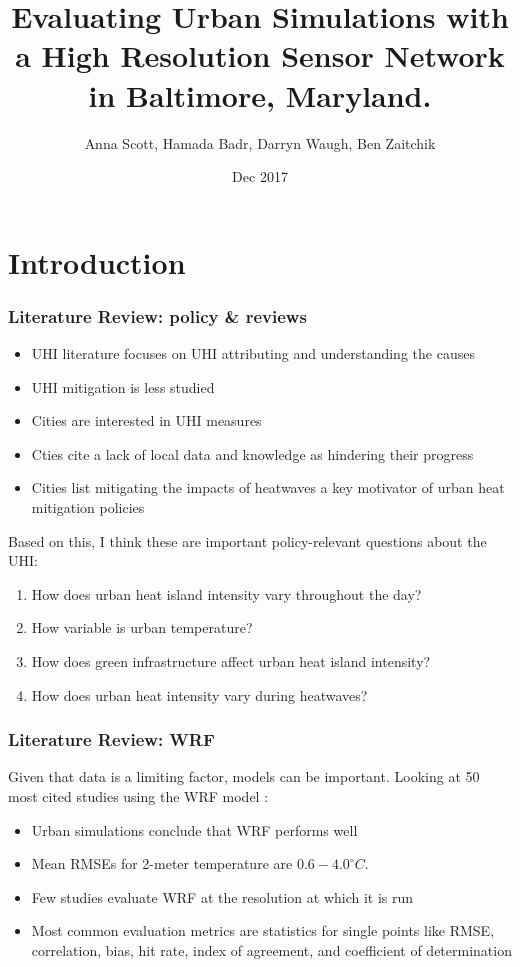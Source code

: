 \documentclass[aspectratio=169, 10pt]{beamer}
\title{Evaluating Urban Simulations with a High Resolution Sensor Network in Baltimore, Maryland.}
\subtitle{}
\date{Dec 2017}
\author{Anna Scott, Hamada Badr, Darryn Waugh, Ben Zaitchik}
\institute{annascott@jhu.edu }
\begin{document}
\maketitle



\section{Introduction}

\begin{frame}
\frametitle{Literature Review: policy \& reviews}
\begin{itemize}
\item UHI literature focuses on UHI attributing and understanding the causes 
\item UHI mitigation is less studied 
\item Cities are interested in UHI measures
\item Cties cite a lack of local data and knowledge as hindering their progress %
\item Cities list mitigating the impacts of heatwaves a key motivator of urban heat mitigation policies %
\end{itemize}
\end{frame}

\begin{frame}
Based on this, I think these are important policy-relevant questions about the UHI:  
\begin{enumerate}
\item How does urban heat island intensity vary throughout the day? 
\item How variable is urban temperature? 
\item How does green infrastructure affect urban heat island intensity? 
\item How does urban heat intensity vary during heatwaves? 
\end{enumerate}
\end{frame}

\begin{frame}[label=intro]
\frametitle{Literature Review: WRF}
Given that data is a limiting factor, models can be important. Looking at 50 most cited studies using the WRF model :
\begin{itemize}
\item Urban simulations conclude that WRF performs well

\item Mean RMSEs for 2-meter temperature are $0.6-4.0^\circ C$.
 
\item Few studies evaluate WRF at the resolution at which it is run 

\item Most common evaluation metrics are statistics for single points like RMSE, correlation, bias, hit rate, index of agreement, and coefficient of determination
\end{itemize}

\end{frame}
\end{document}
